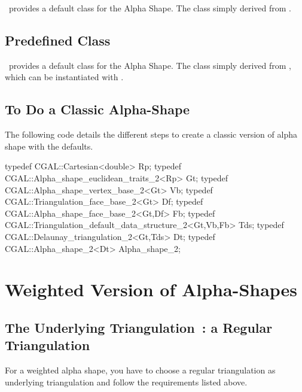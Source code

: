 \cgal\ provides a default  class
for the Alpha Shape. The class
 simply derived from 
.


\subsection*{Predefined \protect {} Class}

\cgal\ provides a default  class
for the Alpha Shape. The class
 simply derived from 
, which can be instantiated with .



\subsection*{To Do a Classic Alpha-Shape}

\ccExample
The following code details the different steps to create 
a classic version of alpha shape with the defaults.

\begin{cprog}
typedef CGAL::Cartesian<double> Rp;
typedef CGAL::Alpha_shape_euclidean_traits_2<Rp> Gt;
typedef CGAL::Alpha_shape_vertex_base_2<Gt> Vb;
typedef CGAL::Triangulation_face_base_2<Gt> Df;
typedef CGAL::Alpha_shape_face_base_2<Gt,Df> Fb;
typedef CGAL::Triangulation_default_data_structure_2<Gt,Vb,Fb> Tds;
typedef CGAL::Delaunay_triangulation_2<Gt,Tds> Dt;
typedef CGAL::Alpha_shape_2<Dt> Alpha_shape_2;
\end{cprog}


\section{Weighted Version of Alpha-Shapes\label{I1_SectWeightedAS}}

\subsection*{The Underlying Triangulation~: a Regular Triangulation}

For a weighted alpha shape, you have to choose a regular triangulation as
underlying triangulation  and follow the requirements listed above.

